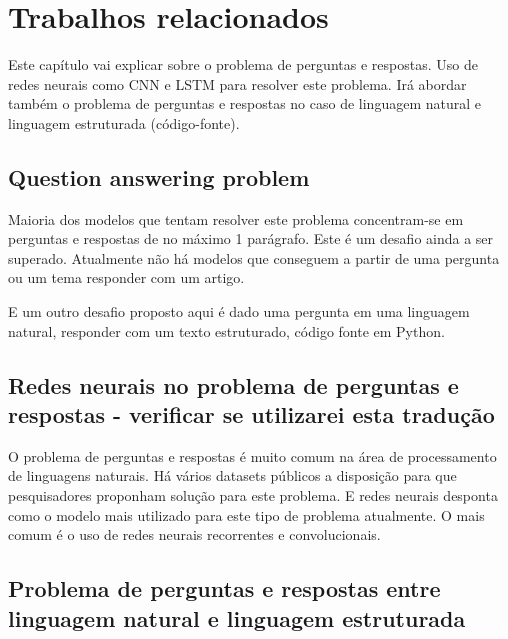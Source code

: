 \chapter{Trabalhos relacionados}
\label{cap:trabalhos-relacionados}

Este capítulo vai explicar sobre o problema de perguntas e respostas. Uso de redes neurais como CNN e LSTM para resolver este problema. Irá abordar também o problema de perguntas e respostas no caso de linguagem natural e linguagem estruturada (código-fonte).

\section{Question answering problem}
\label{sec:fundamentos}

Maioria dos modelos que tentam resolver este problema concentram-se em perguntas e respostas de no máximo 1 parágrafo. Este é um desafio ainda a ser superado. Atualmente não há modelos que conseguem a partir de uma pergunta ou um tema responder com um artigo. 


E um outro desafio proposto aqui é dado uma pergunta em uma linguagem natural, responder com um texto estruturado, código fonte em Python.




\section{Redes neurais no problema de perguntas e respostas - verificar se utilizarei esta tradução}
\label{sec:exemplo_codigo_fonte}

O problema de perguntas e respostas é muito comum na área de processamento de linguagens naturais. Há vários datasets públicos a disposição para que pesquisadores proponham solução para este problema. E redes neurais desponta como o modelo mais utilizado para este tipo de problema atualmente. O mais comum é o uso de redes neurais recorrentes e convolucionais. 


\section{Problema de perguntas e respostas entre linguagem natural e linguagem estruturada}
\label{sec:algumas_referencias}

